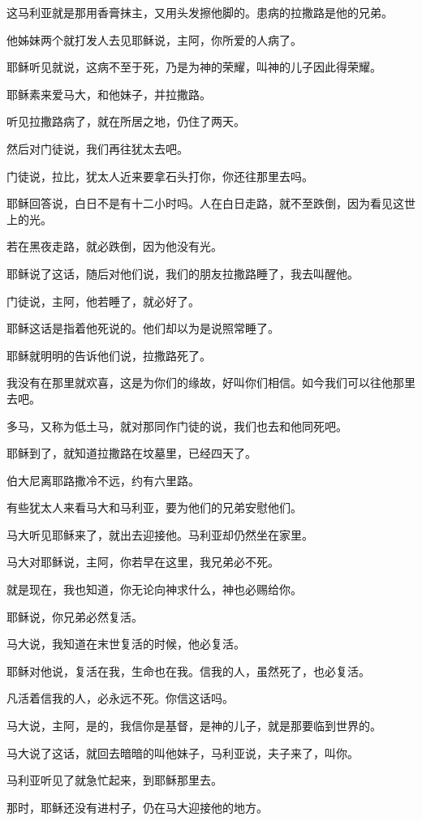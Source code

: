 \documentclass[12pt,oneside]{book}
\begin{document}
这马利亚就是那用香膏抹主，又用头发擦他脚的。患病的拉撒路是他的兄弟。

他姊妹两个就打发人去见耶稣说，主阿，你所爱的人病了。

耶稣听见就说，这病不至于死，乃是为神的荣耀，叫神的儿子因此得荣耀。

耶稣素来爱马大，和他妹子，并拉撒路。

听见拉撒路病了，就在所居之地，仍住了两天。

然后对门徒说，我们再往犹太去吧。

门徒说，拉比，犹太人近来要拿石头打你，你还往那里去吗。

耶稣回答说，白日不是有十二小时吗。人在白日走路，就不至跌倒，因为看见这世上的光。

若在黑夜走路，就必跌倒，因为他没有光。

耶稣说了这话，随后对他们说，我们的朋友拉撒路睡了，我去叫醒他。

门徒说，主阿，他若睡了，就必好了。

耶稣这话是指着他死说的。他们却以为是说照常睡了。

耶稣就明明的告诉他们说，拉撒路死了。

我没有在那里就欢喜，这是为你们的缘故，好叫你们相信。如今我们可以往他那里去吧。

多马，又称为低土马，就对那同作门徒的说，我们也去和他同死吧。

耶稣到了，就知道拉撒路在坟墓里，已经四天了。

伯大尼离耶路撒冷不远，约有六里路。

有些犹太人来看马大和马利亚，要为他们的兄弟安慰他们。

马大听见耶稣来了，就出去迎接他。马利亚却仍然坐在家里。

马大对耶稣说，主阿，你若早在这里，我兄弟必不死。

就是现在，我也知道，你无论向神求什么，神也必赐给你。

耶稣说，你兄弟必然复活。

马大说，我知道在末世复活的时候，他必复活。

耶稣对他说，复活在我，生命也在我。信我的人，虽然死了，也必复活。

凡活着信我的人，必永远不死。你信这话吗。

马大说，主阿，是的，我信你是基督，是神的儿子，就是那要临到世界的。

马大说了这话，就回去暗暗的叫他妹子，马利亚说，夫子来了，叫你。

马利亚听见了就急忙起来，到耶稣那里去。

那时，耶稣还没有进村子，仍在马大迎接他的地方。
\end{document}
